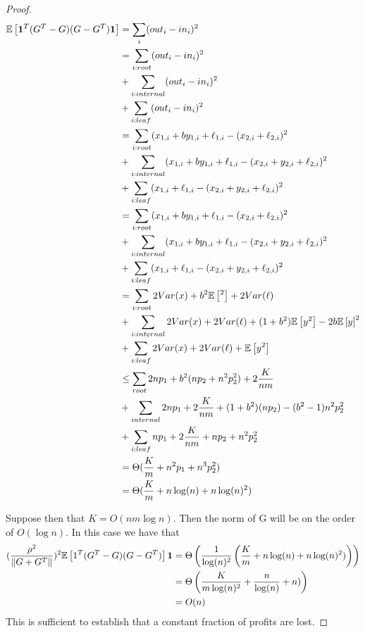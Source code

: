 \begin{proof}
    \begin{align*}
        \mathbb{E}\left[  \mathbf{1}^T (G^T - G)(G-G^T) \mathbf{1} \right] &= \sum_{i } (out_i - in_i)^2 \\ 
        &= \sum_{i : root } (out_i - in_i)^2 \\
        &+ \sum_{i : internal} (out_i - in_i)^2 \\
        &+ \sum_{i : leaf}(out_i - in_i)^2  \\
        &= \sum_{i : root } (x_{1,i} + b y_{1,i} + \ell_{1,i} - (x_{2,i} + \ell_{2,i} )^2 \\
        &+ \sum_{i : internal} (x_{1,i} + b y_{1,i} + \ell_{1,i} - (x_{2,i} + y_{2, i} + \ell_{2,i} )^2  \\
        &+ \sum_{i : leaf} (x_{1,i}  + \ell_{1,i} - (x_{2,i} + y_{2, i} + \ell_{2,i} )^2  \\ 
        &=  \sum_{i : root } (x_{1,i} + b y_{1,i} + \ell_{1,i} - (x_{2,i} + \ell_{2,i} )^2 \\
        &+ \sum_{i : internal} (x_{1,i} + b y_{1,i} + \ell_{1,i} - (x_{2,i} + y_{2, i} + \ell_{2,i} )^2  \\
        &+ \sum_{i : leaf} (x_{1,i}  + \ell_{1,i} - (x_{2,i} + y_{2, i} + \ell_{2,i} )^2  \\ 
        &= \sum_{i : root} 2 Var(x) + b^2 \mathbb{E}\left[ ^2\right] + 2Var(\ell) \\ 
        &+ \sum_{i : internal} 2 Var(x) + 2 Var(\ell) + (1+b^2) \mathbb{E}\left[ y^2\right] - 2b \mathbb{E}\left[ y\right]^2 \\
        &+ \sum_{i :leaf } 2 Var(x) + 2 Var(\ell) + \mathbb{E}\left[ y^2\right] \\
        &\leq  \sum_{root} 2 n p_1 + b^2 (n p_2 + n^2 p_2^2 ) + 2 \frac{K}{nm} \\
        &+ \sum_{internal} 2 n p_1 + 2 \frac{K}{nm} + (1+b^2)(n p_2) - (b^2 -1) n^2 p_2^2 \\ 
        &+\sum_{i : leaf} np_1 + 2\frac{K}{nm} + np_2 + n^2 p_2^2\\ 
        &= \Theta ( \frac{K}{m} + n^2 p_1 + n^3 p_2^2  ) \\
        &= \Theta( \frac{K}{m} + n \log(n) + n \log(n)^2 )
    \end{align*}

    Suppose then that $K = O(nm \log n)$. Then the norm of G will be on the order of $O(\log n)$. 
    In this case we have that 
    \begin{align*}
        (\frac{\rho^2}{\|G+G^T\|} )^2 \mathbb{E}\left[  1^T (G^T-G)(G-G^T) \right] \mathbf{1} &= \Theta \left( \frac{1}{\log(n)^2 } \left( \frac{K}{m} + n \log(n) + n \log(n)^2 ) \right) \right)\\
        &= \Theta \left( \frac{K}{m \log(n)^2} + \frac{n}{\log(n)} + n  ) \right) \\
        &= O(n)
    \end{align*}
    This is sufficient to establish that a constant fraction of profits are lost. 


\end{proof}
